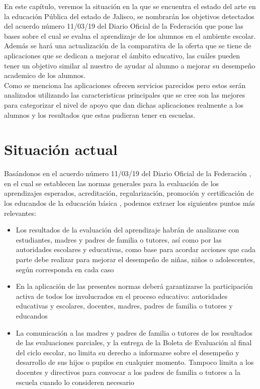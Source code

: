 
    En este capítulo, veremos la situación en la que se encuentra el estado del arte en la educación Pública del estado de Jalisco, se nombrarán los objetivos detectados del acuerdo número 11/03/19 del Diario Oficial de la Federación \cite{sep} que pone las bases sobre el cual se evalua el aprendizaje de los alumnos en el ambiente escolar. \\ Además se hará una actualización de la comparativa de la oferta que se tiene de aplicaciones que se dedican a mejorar el ámbito educativo, las cuáles pueden tener un objetivo similar al nuestro de ayudar al alumno a mejorar su desempeño academico de los alumnos. \\ Como se menciona las aplicaciones ofrecen servicios parecidos pero estos serán analizados utilizando las caracteristicas principales que se cree son las mejores para categorizar el nivel de apoyo que dan dichas aplicaciones realmente a los alumnos y los resultados que estas pudieran tener en escuelas.

    \section{Situación actual}
    
        Basándonos en el acuerdo número 11/03/19 del Diario Oficial de la Federación \cite{sep}, en el cual se establecen las normas generales para la evaluación de los aprendizajes esperados, acreditación, regularización, promoción y certificación de los educandos de la educación básica \cite{sep}, podemos extraer los siguientes puntos más relevantes:
    
        \begin{itemize}
            \item Los resultados de la evaluación del aprendizaje habrán de analizarse con estudiantes, madres y padres de familia o tutores, así como por las autoridades escolares y educativas, como base para acordar acciones que cada parte debe realizar para mejorar el desempeño de niñas, niños o adolescentes, según corresponda en cada caso
            
            \item En la aplicación de las presentes normas deberá garantizarse la participación activa de todos los involucrados en el proceso educativo: autoridades educativas y escolares, docentes, madres, padres de familia o tutores y educandos
            
            \item La comunicación a las madres y padres de familia o tutores de los resultados de las evaluaciones parciales, y la entrega de la Boleta de Evaluación al final del ciclo escolar, no limita su derecho a informarse sobre el desempeño y desarrollo de sus hijos o pupilos en cualquier momento. Tampoco limita a los docentes y directivos para convocar a los padres de familia o tutores a la escuela cuando lo consideren necesario
            
        \end{itemize}
        

